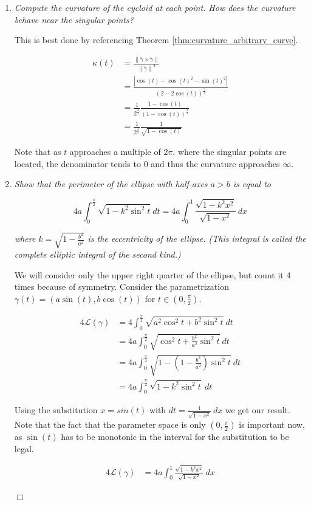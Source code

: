 \documentclass[a4paper,11pt,notitlepage,fullpage]{paper}
\newcommand{\dy}{\dot\gamma}
\newcommand{\ddy}{\ddot\gamma}
\theoremstyle{plain}
\theoremstyle{definition}
\begin{document}
\begin{enumerate}
\item \emph{Compute the curvature of the cycloid at each point. How does the curvature behave near the singular points?}

This is best done by referencing Theorem \ref{thm:curvature_arbitrary_curve}.

\begin{align*}
\kappa(t) &= \frac{\left\|\dy \times \ddy\right\|}{\left\|\dy\right\|^3} \\
&= \frac{|\cos(t) - \cos(t)^2 - \sin(t)^2|}{(2 - 2\cos(t))^{\frac{3}{2}}} \\
&= \frac{1}{2^{\frac{3}{2}}} \frac{1 - \cos(t)}{(1 - \cos(t))^{\frac{3}{2}}} \\
&= \frac{1}{2^{\frac{3}{2}}} \frac{1}{\sqrt{1 - \cos(t)}}
\end{align*}

Note that as $t$ approaches a multiple of $2\pi$, where the singular points are located, the denominator tends to $0$ and thus the curvature approaches $\infty$.



\item \emph{Show that the perimeter of the ellipse with half-axes $a>b$ is equal to }

\begin{equation*}
4a \int_0^\frac{\pi}{2} \sqrt{1 - k^2 \sin^2t} ~dt = 4a \int_0^1 \frac{\sqrt{1 - k^2 x^2}}{\sqrt{1 - x^2}} ~dx
\end{equation*}

\emph{where $k = \sqrt{1 - \frac{b^2}{a^2}}$ is the eccentricity of the ellipse. (This integral is called the complete elliptic integral of the second kind.)}

We will consider only the upper right quarter of the ellipse, but count it 4 times because of symmetry. Consider the parametrization $\gamma(t) = (a \sin(t), b \cos(t))$ for $t \in (0, \frac{\pi}{2})$.

\begin{align*}
4 \mathcal L(\gamma) &= 4 \int_0^\frac{\pi}{2} \sqrt{a^2 \cos^2t + b^2\sin^2t} ~dt \\
&= 4a \int_0^\frac{\pi}{2} \sqrt{\cos^2t + \frac{b^2}{a^2}\sin^2t} ~dt \\
&= 4a \int_0^\frac{\pi}{2} \sqrt{1 - \left(1 - \frac{b^2}{a^2}\right)\sin^2t} ~dt \\
&= 4a \int_0^\frac{\pi}{2} \sqrt{1 - k^2 \sin^2t} ~dt 
\end{align*}

Using the substitution $x = sin(t)$ with $dt = \frac{1}{\sqrt{1-x^2}} ~dx$ we get our result. Note that the fact that the parameter space is only $(0, \frac{\pi}{2})$ is important now, as $\sin(t)$ has to be monotonic in the interval for the substitution to be legal. 

\begin{align*}
4 \mathcal L(\gamma) &= 4a \int_0^1 \frac{\sqrt{1 - k^2 x^2}}{\sqrt{1 - x^2}} ~dx
\end{align*}

\hfill $\Box$

\end{enumerate}
\end{document}

